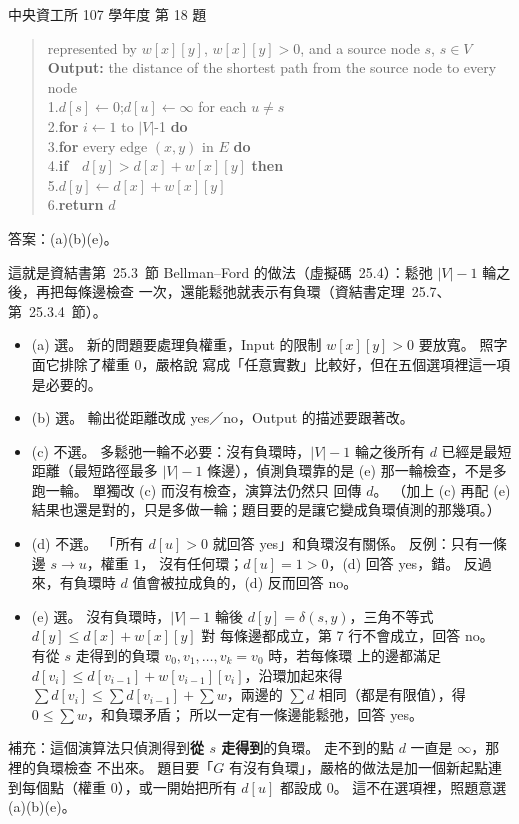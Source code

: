 \begin{pastexam}[label={px:ncu-107-dsa-18}]{中央資工所 107 學年度 第 18 題}
\begin{quote}
represented by $w[x][y]$, $w[x][y]>0$, and a source node $s$, $s\in V$\\
\textbf{Output:} the distance of the shortest path from the source node to every node\\
1.\quad $d[s]\leftarrow 0$;\quad $d[u]\leftarrow\infty$ for each $u\ne s$\\
2.\quad \textbf{for} $i\leftarrow 1$ to $|V|$-1 \textbf{do}\\
3.\quad\quad \textbf{for} every edge $(x,y)$ in $E$ \textbf{do}\\
4.\quad\quad\quad \textbf{if}\ \ $d[y]>d[x]+w[x][y]$ \textbf{then}\\
5.\quad\quad\quad\quad $d[y]\leftarrow d[x]+w[x][y]$\\
6.\quad \textbf{return} $d$
\end{quote}
\end{pastexam}

\begin{pastsoln}
答案：(a)(b)(e)。

這就是資結書第~25.3~節 Bellman--Ford 的做法（虛擬碼~25.4）：鬆弛 $|V| - 1$ 輪之後，再把每條邊檢查
一次，還能鬆弛就表示有負環（資結書定理~25.7、第~25.3.4~節）。

\begin{itemize}
\item (a) 選。 新的問題要處理負權重，Input 的限制 $w[x][y] > 0$ 要放寬。 照字面它排除了權重 $0$，嚴格說
寫成「任意實數」比較好，但在五個選項裡這一項是必要的。
\item (b) 選。 輸出從距離改成 yes／no，Output 的描述要跟著改。
\item (c) 不選。 多鬆弛一輪不必要：沒有負環時，$|V| - 1$ 輪之後所有 $d$ 已經是最短距離（最短路徑最多
$|V| - 1$ 條邊），偵測負環靠的是 (e) 那一輪檢查，不是多跑一輪。 單獨改 (c) 而沒有檢查，演算法仍然只
回傳 $d$。 （加上 (c) 再配 (e) 結果也還是對的，只是多做一輪；題目要的是讓它變成負環偵測的那幾項。）
\item (d) 不選。 「所有 $d[u] > 0$ 就回答 yes」和負環沒有關係。 反例：只有一條邊 $s \to u$，權重 $1$，
沒有任何環；$d[u] = 1 > 0$，(d) 回答 yes，錯。 反過來，有負環時 $d$ 值會被拉成負的，(d) 反而回答 no。
\item (e) 選。 沒有負環時，$|V| - 1$ 輪後 $d[y] = \delta(s, y)$，三角不等式 $d[y] \le d[x] + w[x][y]$ 對
每條邊都成立，第 7 行不會成立，回答 no。 有從 $s$ 走得到的負環 $v_0, v_1, \ldots, v_k = v_0$ 時，若每條環
上的邊都滿足 $d[v_i] \le d[v_{i-1}] + w[v_{i-1}][v_i]$，沿環加起來得
$\sum d[v_i] \le \sum d[v_{i-1}] + \sum w$，兩邊的 $\sum d$ 相同（都是有限值），得 $0 \le \sum w$，和負環矛盾；
所以一定有一條邊能鬆弛，回答 yes。
\end{itemize}

補充：這個演算法只偵測得到\textbf{從 $s$ 走得到}的負環。 走不到的點 $d$ 一直是 $\infty$，那裡的負環檢查
不出來。 題目要「$G$ 有沒有負環」，嚴格的做法是加一個新起點連到每個點（權重 $0$），或一開始把所有
$d[u]$ 都設成 $0$。 這不在選項裡，照題意選 (a)(b)(e)。
\end{pastsoln}
